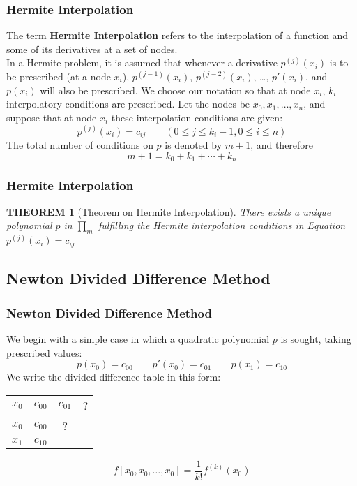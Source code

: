 \documentclass[notheorems,mathserif,table,compress]{beamer}  %
\begin{document}
\begin{frame}
  \frametitle{Hermite Interpolation}
  The term \textbf{Hermite Interpolation} refers to the interpolation of a function and some of its derivatives at a set of nodes. \\
  In a Hermite problem, it is assumed that whenever a derivative $p^{(j)}(x_i)$ is to be prescribed (at a node $x_i$), $p^{(j-1)}(x_i)$, $p^{(j-2)}(x_i)$, \dots, $p'(x_i)$, and $p(x_i)$ will also be prescribed. We choose our notation so that at node $x_i$, $k_i$ interpolatory conditions are prescribed. Let the nodes be $x_0,x_1,\ldots,x_n$, and suppose that at node $x_i$ these interpolation conditions are given:
  \[ p^{(j)}(x_i)=c_{ij} \qquad (0 \le j \le k_i-1,0 \le i \le n) \]
  The total number of conditions on $p$ is denoted by $m+1$, and therefore
  \[ m+1=k_0+k_1+\cdots+k_n \]
\end{frame}


\begin{frame}
  \frametitle{Hermite Interpolation}
  \newtheorem{theorem 3}[theorem 1]{THEOREM}
  \begin{theorem 3}[Theorem on Hermite Interpolation]
  There exists a unique polynomial $p$ in $\prod_m$ fulfilling the Hermite interpolation conditions in Equation $p^{(j)}(x_i)=c_{ij}$
  \end{theorem 3}
\end{frame}


\subsection{Newton Divided Difference Method}


\begin{frame}
  \frametitle{Newton Divided Difference Method}
  We begin with a simple case in which a quadratic polynomial $p$ is sought, taking prescribed values:
  \[ p(x_0)=c_{00} \qquad p'(x_0)=c_{01} \qquad p(x_1)=c_{10} \]
  We write the divided difference table in this form:\\
  \begin{tabular}{c c| c c}
  $x_0$    & $c_{00}$    & $c_{01}$    &  ? \\
  $x_0$    & $c_{00}$    &    ?        &    \\
  $x_1$    & $c_{10}$    &             &    \\  
  \end{tabular}
  \[ f[x_0,x_0,\ldots,x_0]=\frac{1}{k!}f^{(k)}(x_0) \]
\end{frame}
\end{document}
